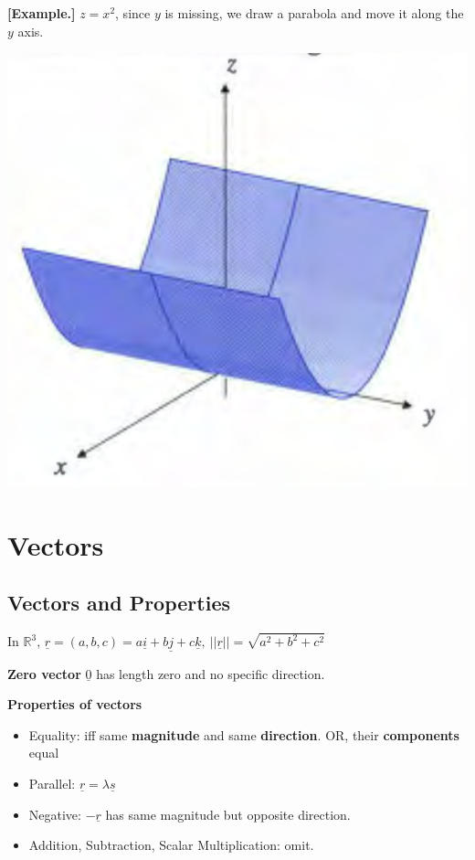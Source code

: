 \documentclass[11pt, a4paper]{MATH2023}
\newcommand{\eg}{\textbf{[Example.] }}
\newcommand{\vct}{\underline}
\begin{document}
\begin{spacing}{1.3}
    \eg $z=x^2$, since $y$ is missing, we draw a parabola and move it 
    along the $y$ axis.
    \begin{center}
        \includegraphics[scale=0.3]{images/Ch10-parabola-ymissing.png}
    \end{center}

    \section{Vectors}
    \subsection{Vectors and Properties}

    In $\mathbb{R}^3$, $\vct{r}=(a,b,c)=a\vct{i}+b\vct{j}+c\vct{k},\  
    ||\vct{r}||=\sqrt{a^2+b^2+c^2}$

    {\bf Zero vector} $\vct{0}$ has length zero and no specific direction.

    {\bf Properties of vectors}
    \begin{itemize}
        \item Equality: iff same {\bf magnitude }and same {\bf direction}.
        OR, their {\bf components} equal 
        \item Parallel: $\vct{r}=\lambda \vct{s}$
        \item Negative: $-\vct{r}$ has same magnitude but opposite direction.
        \item Addition, Subtraction, Scalar Multiplication: omit.
    \end{itemize}


\end{spacing}
\end{document}
